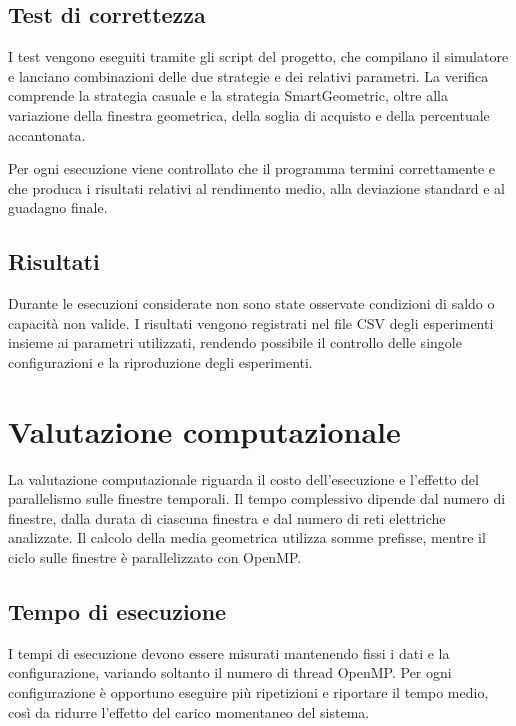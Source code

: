 \documentclass[12pt,a4paper,oneside]{report}
\begin{document}
\subsection{Test di correttezza}

I test vengono eseguiti tramite gli script del progetto, che compilano il
simulatore e lanciano combinazioni delle due strategie e dei relativi
parametri. La verifica comprende la strategia casuale e la strategia
SmartGeometric, oltre alla variazione della finestra geometrica, della soglia
di acquisto e della percentuale accantonata.

Per ogni esecuzione viene controllato che il programma termini correttamente
e che produca i risultati relativi al rendimento medio, alla deviazione
standard e al guadagno finale.

\subsection{Risultati}

Durante le esecuzioni considerate non sono state osservate condizioni di
saldo o capacità non valide. I risultati vengono registrati nel file CSV
degli esperimenti insieme ai parametri utilizzati, rendendo possibile
il controllo delle singole configurazioni e la riproduzione degli
esperimenti.

 

\section{Valutazione computazionale}

La valutazione computazionale riguarda il costo dell'esecuzione e l'effetto
del parallelismo sulle finestre temporali. Il tempo complessivo dipende dal
numero di finestre, dalla durata di ciascuna finestra e dal numero di reti
elettriche analizzate. Il calcolo della media geometrica utilizza somme
prefisse, mentre il ciclo sulle finestre è parallelizzato con OpenMP.

\subsection{Tempo di esecuzione}

I tempi di esecuzione devono essere misurati mantenendo fissi i dati e la
configurazione, variando soltanto il numero di thread OpenMP. Per ogni
configurazione è opportuno eseguire più ripetizioni e riportare il tempo
medio, così da ridurre l'effetto del carico momentaneo del sistema.
\end{document}
